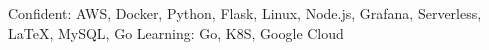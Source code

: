 

\begin{cvskills}

  \cvskill
    {Confident:} %
    {AWS, Docker, Python, Flask, Linux, Node.js, Grafana, Serverless, LaTeX, MySQL, Go}
  \cvskill
    {Learning:} %
    {Go, K8S, Google Cloud}

\end{cvskills}
